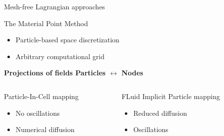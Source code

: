 \begin{withoutheadline}
  \begin{frame}{Mesh-free Lagrangian approaches}
    
    \begin{block}{The Material Point Method \cite{Sulsky94}}
      \begin{footnotesize}
        \begin{itemize}
        \item Particle-based space discretization
        \item Arbitrary computational grid
        \end{itemize}
      \end{footnotesize}
      
      \centering
      \textbf{Projections of fields Particles $\leftrightarrow$ Nodes}
    \end{block}

    \begin{columns}
      \begin{column}{0.48\textwidth}
        \begin{block}{\footnotesize Particle-In-Cell mapping \cite{PIC}}
          \begin{footnotesize}
            \begin{itemize}
            \item[] No oscillations 
            \item[] Numerical diffusion
            \end{itemize}
          \end{footnotesize}
        \end{block}
      \end{column}
      \begin{column}{0.48\textwidth}
        \begin{block}{\footnotesize FLuid Implicit Particle mapping \cite{PIC_Nishiguchi}}
          \begin{footnotesize}
            \begin{itemize}
            \item[] Reduced diffusion 
            \item[] Oscillations
            \end{itemize}
          \end{footnotesize}
        \end{block}
      \end{column}
    \end{columns}
    \vspace{-0.3cm}
  \end{frame}
\end{withoutheadline}


